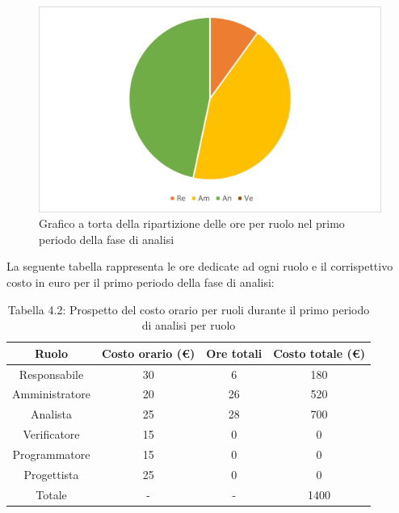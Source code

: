 \begin{figure}[H]
    \centering
    \includegraphics[scale=0.6]{img/grafi preventivo/torta/analisi/periodo1.png}
    \caption{Grafico a torta della ripartizione delle ore per ruolo nel primo periodo della fase di analisi}
\end{figure}
La seguente tabella rappresenta le ore dedicate ad ogni ruolo e il corrispettivo costo in euro per il primo periodo della fase di analisi:
\begin{table}[H]
	\setlength\extrarowheight{5pt}
	\centering
	\begin{tabularx}{\textwidth}{|ccc|c|}
		\hline
		\rowcolor{white}
		\textbf{Ruolo} & \textbf{Costo orario (€)} & \textbf{Ore totali} & \textbf{Costo totale (€)} \\
		\hline
		Responsabile &30&6&180 \\
		Amministratore &20&26&520 \\
		Analista &25&28&700 \\
		Verificatore &15&0&0 \\
		Programmatore &15&0&0 \\
		Progettista &25&0&0 \\
		\hline
		Totale &-&-&1400 \\
		\hline
	\end{tabularx}
    \vspace{10pt}
	\caption{Tabella 4.2: Prospetto del costo orario per ruoli durante il primo periodo di analisi per ruolo}
\end{table}
\newpage
